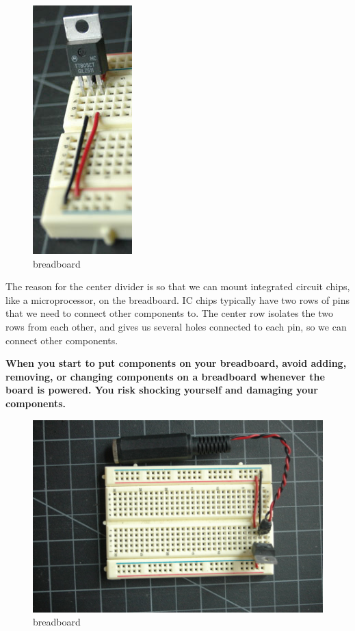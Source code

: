 \begin{figure}[!htb]
     \centering
     \includegraphics[scale=0.8]{img/breadboard/bboard_vreg_2.jpg}
     \caption{breadboard}
     \label{breadboard}
\end{figure}

The reason for the center divider is so that we can mount integrated circuit chips, like a microprocessor, on the breadboard. IC chips typically have two rows of pins that we need to connect other components to. The center row isolates the two rows from each other, and gives us several holes connected to each pin, so we can connect other components.

\textbf{When you start to put components on your breadboard, avoid adding, removing, or changing components on a breadboard whenever the board is powered. You risk shocking yourself and damaging your components.}

\begin{figure}[!htb]
     \centering
     \includegraphics[scale=0.8]{img/breadboard/bboard_vreg_power_conn.jpg}
     \caption{breadboard}
     \label{breadboard}
\end{figure}

